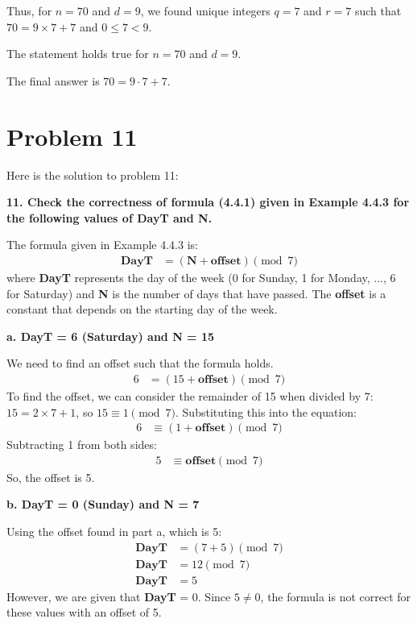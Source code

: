 \documentclass{article}
\begin{document}
Thus, for $n=70$ and $d=9$, we found unique integers $q=7$ and $r=7$ such that $70 = 9 \times 7 + 7$ and $0 \leq 7 < 9$.

The statement holds true for $n=70$ and $d=9$.

The final answer is $\boxed{70 = 9 \cdot 7 + 7}$.

\newpage

\section*{\textbf{Problem 11}}
Here is the solution to problem 11:

\textbf{11. Check the correctness of formula (4.4.1) given in Example 4.4.3 for the following values of \textbf{DayT} and \textbf{N}.}

The formula given in Example 4.4.3 is:
\begin{align} \label{eq:1} \textbf{DayT} &= (\textbf{N} + \textbf{offset}) \pmod{7}\end{align}
where \textbf{DayT} represents the day of the week (0 for Sunday, 1 for Monday, ..., 6 for Saturday) and \textbf{N} is the number of days that have passed. The \textbf{offset} is a constant that depends on the starting day of the week.

\textbf{a. \textbf{DayT} = 6 (Saturday) and \textbf{N} = 15}

We need to find an offset such that the formula holds.
\begin{align} 6 &= (15 + \textbf{offset}) \pmod{7} \end{align}
To find the offset, we can consider the remainder of 15 when divided by 7:
$15 = 2 \times 7 + 1$, so $15 \equiv 1 \pmod{7}$.
Substituting this into the equation:
\begin{align} 6 &\equiv (1 + \textbf{offset}) \pmod{7} \end{align}
Subtracting 1 from both sides:
\begin{align} 5 &\equiv \textbf{offset} \pmod{7} \end{align}
So, the offset is 5.

\textbf{b. \textbf{DayT} = 0 (Sunday) and \textbf{N} = 7}

Using the offset found in part a, which is 5:
\begin{align} \textbf{DayT} &= (7 + 5) \pmod{7} \\ \textbf{DayT} &= 12 \pmod{7} \\ \textbf{DayT} &= 5 \end{align}
However, we are given that \textbf{DayT} = 0. Since $5 \neq 0$, the formula is not correct for these values with an offset of 5.
\end{document}
